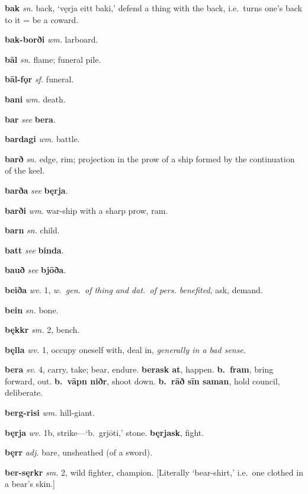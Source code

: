 \documentclass[12pt,letterpaper]{book}
\begin{document}
\noindent
\textbf{bak} \textit{sn.} back, `vęrja eitt baki,' defend a thing with
	the back, i.e.\ turns one's back to it = be a coward.

\noindent
\textbf{bak-borði} \textit{wm.} larboard.

\noindent
\textbf{bāl} \textit{sn.} flame; funeral pile.

\noindent
\textbf{bāl-fǫr} \textit{sf.} funeral.

\noindent
\textbf{bani} \textit{wm.} death.

\noindent
\textbf{bar} \textit{} \textit{see} \textbf{bera}.

\noindent
\textbf{bardagi} \textit{wm.} battle.

\noindent
\textbf{barð} \textit{sn.} edge, rim; projection in the prow of a ship
	formed by the continuation of the keel.

\noindent
\textbf{barða} \textit{} \textit{see} \textbf{bęrja}.

\noindent
\textbf{barði} \textit{wm.} war-ship with a sharp prow, ram.

\noindent
\textbf{barn} \textit{sn.} child.

\noindent
\textbf{batt} \textit{} \textit{see} \textbf{binda}.

\noindent
\textbf{bauð} \textit{} \textit{see} \textbf{bjōða}.

\noindent
\textbf{beiða} \textit{wv.} 1, \textit{w.\ gen.\ of thing and dat.\ of pers.
	benefited}, ask, demand.

\noindent
\textbf{bein} \textit{sn.} bone.

\noindent
\textbf{bękkr} \textit{sm.} 2, bench.

\noindent
\textbf{bęlla} \textit{wv.} 1, occupy oneself with, deal in, \textit{generally
	in a bad sense}.

\noindent
\textbf{bera} \textit{sv.} 4, carry, take; bear, endure.  \textbf{berask at},
	happen.  \textbf{b.\ fram}, bring forward, out.  \textbf{b.\ vāpn niðr},
	shoot down.  \textbf{b.\ rāð sīn saman}, hold council, deliberate.

\noindent
\textbf{berg-risi} \textit{wm.} hill-giant.

\noindent
\textbf{bęrja} \textit{wv.} 1b, strike---`b.\ grjōti,' stone.  \textbf{bęrjask},
	fight.

\noindent
\textbf{bęrr} \textit{adj.} bare, unsheathed (of a sword).

\noindent
\textbf{ber-sęrkr} \textit{sm.} 2, wild fighter, champion.  [Literally
    `bear-shirt,' i.e.\ one clothed in a bear's skin.]
\end{document}
